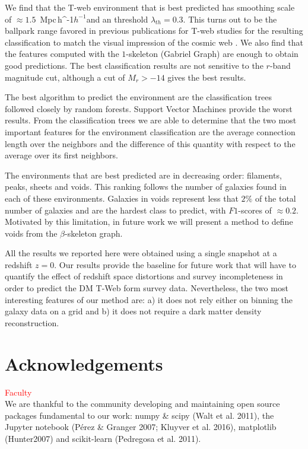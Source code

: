 \documentclass[usenatbib]{mnras}
\newcommand{\Mpch}{\,{\rm Mpc}\,\ifmmode h^{-1}\else $h^{-1}$\fi}
\begin{document}
We find that the T-web environment that is best predicted has smoothing
scale of $\approx1.5$ \Mpch and an threshold $\lambda_{th}=0.3$. 
This turns out to be the ballpark range  favored in previous publications
for T-web  studies for the resulting classification to match the visual impression of the cosmic web \citep{Forero-Romero2009}.
We also find that the features computed with the $1$-skeleton 
(Gabriel Graph) are enough to obtain good predictions. 
The best classification results are not sensitive to the $r$-band
magnitude cut, although a cut of $M_r>-14$ gives the best results.

The best algorithm to predict the environment are the classification
trees followed closely by random forests. 
Support Vector Machines provide the worst results.
From the classification trees we are able to determine that the two most
important features for the environment classification are the average
connection length over the neighbors and the difference of this quantity
with respect to the average over its first neighbors.

The environments that are best predicted are in decreasing order: 
filaments, peaks, sheets and voids. 
This ranking follows the number of galaxies found in each of these environments.
Galaxies in voids represent less that $2\%$ of the total number of galaxies and 
are the hardest class to predict, with $F1$-scores of $\approx0.2$.
Motivated by this limitation, in future work we will present a method to define
voids from the $\beta$-skeleton graph.

All the results we reported here were obtained using a single snapshot at a 
redshift $z=0$.
Our results provide the baseline for future work that will have to quantify 
the effect of redshift space distortions and survey incompleteness in order to
predict  the DM T-Web form survey data.
Nevertheless, the two most interesting features of our method are: a) it does not
rely either on binning the galaxy data on a grid and b) it does not require 
a dark matter density reconstruction.



\section*{Acknowledgements}
\textcolor{red}{Faculty}\\
We are thankful to the community developing and maintaining open source packages fundamental to our work: numpy
\&  scipy  (Walt  et  al.  2011),  the  Jupyter  notebook  (P\'erez \& Granger 2007; Kluyver et al. 2016), matplotlib (Hunter2007) and  scikit-learn (Pedregosa et al. 2011).
\end{document}
